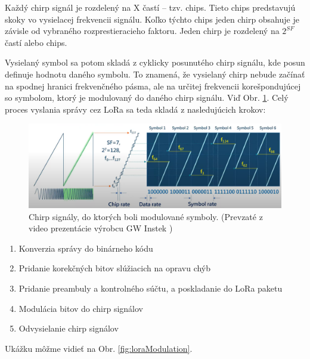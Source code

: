 \documentclass[slovak,master]{diploma}
\begin{document}
Každý chirp signál je rozdelený na X častí -- tzv. chips. Tieto chips predstavujú skoky vo vysielacej frekvencii signálu. 
Koľko týchto chips jeden chirp obsahuje je závisle od vybraného rozprestieracieho faktoru. 
Jeden chirp je rozdelený na $2^{SF}$ častí alebo chips.

Vysielaný symbol sa potom skladá z cyklicky posunutého chirp signálu, kde posun definuje hodnotu daného symbolu. 
To znamená, že vysielaný chirp nebude začínať na spodnej hranici frekvenčného pásma, ale na určitej frekvencii korešpondujúcej so symbolom, 
ktorý je modulovaný do daného chirp signálu. Viď Obr. \ref{fig:loraSymbols}. Celý proces vyslania správy cez LoRa sa teda skladá z nasledujúcich krokov:

\begin{figure}
	\centering
	\includegraphics[width=1\textwidth]{Figures/loraSymbols.png}
	\caption[Symboly modulované do Chirp signálov]{Chirp signály, do ktorých boli modulované symboly. (Prevzaté z video prezentácie výrobcu GW Instek \cite{loratester})}
	\label{fig:loraSymbols}
\end{figure}

\begin{enumerate}
  \item Konverzia správy do binárneho kódu
  \item Pridanie korekčných bitov slúžiacich na opravu chýb
  \item Pridanie preambuly a kontrolného súčtu, a poskladanie do LoRa paketu
  \item Modulácia bitov do chirp signálov
  \item Odvysielanie chirp signálov
\end{enumerate}
Ukážku môžme vidieť na Obr. \ref{fig:loraModulation}.
\end{document}
